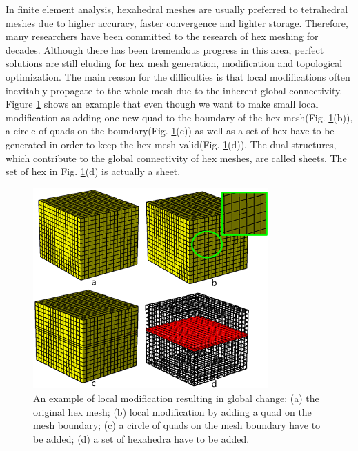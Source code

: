 \documentclass[final,5p,times,twocolumn]{elsarticle}
\begin{document}
In finite element analysis, hexahedral meshes are usually preferred to tetrahedral meshes due to higher accuracy, faster convergence and lighter storage\cite{Shepherd:2007tg,Shepherd:2008dg}. Therefore, many researchers have been committed to the research of hex meshing for decades. Although there has been tremendous progress in this area, perfect solutions are still eluding for hex mesh generation, modification and topological optimization. The main reason for the difficulties is that local modifications often inevitably propagate to the whole mesh due to the inherent global connectivity\cite{Murdoch:1997fy, Tautges:2003vt, Ledoux:2009cg, Ramos:2014jq}. Figure \ref{fig:global_structure} shows an example that even though we want to make small local modification as adding one new quad to the boundary of the hex mesh(Fig. \ref{fig:global_structure}(b)), a circle of quads on the boundary(Fig. \ref{fig:global_structure}(c)) as well as a set of hex have to be generated in order to keep the hex mesh valid(Fig. \ref{fig:global_structure}(d)). The dual structures, which contribute to the global connectivity of hex meshes, are called sheets. The set of hex in Fig. \ref{fig:global_structure}(d) is actually a sheet.

\begin{figure}[htbp]
\begin{center}
\includegraphics[width=9cm]{rev_figures/global_structure.png}
\caption{An example of local modification resulting in global change: (a) the original hex mesh; (b) local modification by adding a quad on the mesh boundary; (c) a circle of quads on the mesh boundary have to be added; (d) a set of hexahedra have to be added.}
\label{fig:global_structure}
\end{center}
\end{figure}
\end{document}
